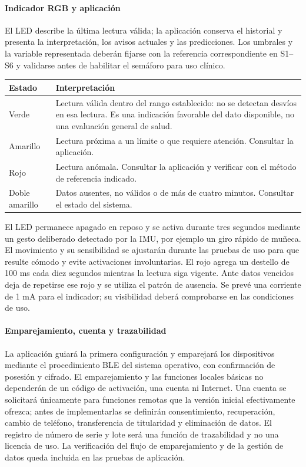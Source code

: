 \paragraph{Indicador RGB y aplicación}
El LED describe la última lectura válida; la aplicación conserva el historial y presenta la interpretación, los avisos actuales y las predicciones. Los umbrales y la variable representada deberán fijarse con la referencia correspondiente en S1--S6 y validarse antes de habilitar el semáforo para uso clínico.
\begin{center}\begin{tabularx}{\linewidth}{lX}\toprule
Estado & Interpretación\\\midrule
Verde & Lectura válida dentro del rango establecido: no se detectan desvíos en esa lectura. Es una indicación favorable del dato disponible, no una evaluación general de salud.\\
Amarillo & Lectura próxima a un límite o que requiere atención. Consultar la aplicación.\\
Rojo & Lectura anómala. Consultar la aplicación y verificar con el método de referencia indicado.\\
Doble amarillo & Datos ausentes, no válidos o de más de cuatro minutos. Consultar el estado del sistema.\\\bottomrule
\end{tabularx}\end{center}
El LED permanece apagado en reposo y se activa durante tres segundos mediante un gesto deliberado detectado por la IMU, por ejemplo un giro rápido de muñeca. El movimiento y su sensibilidad se ajustarán durante las pruebas de uso para que resulte cómodo y evite activaciones involuntarias. El rojo agrega un destello de 100 ms cada diez segundos mientras la lectura siga vigente. Ante datos vencidos deja de repetirse ese rojo y se utiliza el patrón de ausencia. Se prevé una corriente de 1 mA para el indicador; su visibilidad deberá comprobarse en las condiciones de uso.

\paragraph{Emparejamiento, cuenta y trazabilidad}
La aplicación guiará la primera configuración y emparejará los dispositivos mediante el procedimiento BLE del sistema operativo, con confirmación de posesión y cifrado. El emparejamiento y las funciones locales básicas no dependerán de un código de activación, una cuenta ni Internet. Una cuenta se solicitará únicamente para funciones remotas que la versión inicial efectivamente ofrezca; antes de implementarlas se definirán consentimiento, recuperación, cambio de teléfono, transferencia de titularidad y eliminación de datos. El registro de número de serie y lote será una función de trazabilidad y no una licencia de uso. La verificación del flujo de emparejamiento y de la gestión de datos queda incluida en las pruebas de aplicación.

